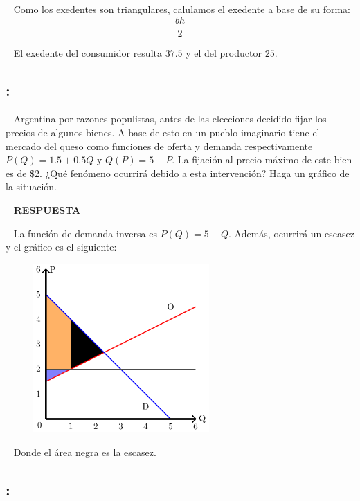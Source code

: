 \documentclass[
  letterpaper,
  DIV=11,
  numbers=noendperiod]{scrreport}
\begin{document}
~ Como los exedentes son triangulares, calulamos el exedente a base de
su forma: \[
\frac{bh}{2}
\]

~ El exedente del consumidor resulta \(37.5\) y el del productor \(25\).

\hypertarget{section-31}{%
\subsection{:}\label{section-31}}

~ Argentina por razones populistas, antes de las elecciones decidido
fijar los precios de algunos bienes. A base de esto en un pueblo
imaginario tiene el mercado del queso como funciones de oferta y demanda
respectivamente \(P(Q)=1.5+0.5Q\) y \(Q(P)=5-P\). La fijación al precio
máximo de este bien es de \$2. ¿Qué fenómeno ocurrirá debido a esta
intervención? Haga un gráfico de la situación.

~ \textbf{RESPUESTA}

~ La función de demanda inversa es \(P(Q)=5-Q\). Además, ocurrirá un
escasez y el gráfico es el siguiente:

\begin{figure}

{\centering \includegraphics[width=0.6\textwidth,height=\textheight]{8ej_pauta_files/figure-pdf/unnamed-chunk-12-1.pdf}

}

\end{figure}

~ Donde el área negra es la escasez.

\hypertarget{section-32}{%
\subsection{:}\label{section-32}}
\end{document}
